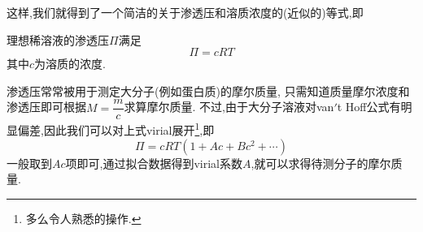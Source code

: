 \documentclass{ctexart}
\begin{document}
这样,我们就得到了一个简洁的关于渗透压和溶质浓度的(近似的)等式,即
\begin{theorem}
    理想稀溶液的渗透压$\Pi$满足
    \[\Pi=cRT\]
    其中$c$为溶质的浓度.
\end{theorem}
渗透压常常被用于测定大分子(例如蛋白质)的摩尔质量,%
只需知道质量摩尔浓度和渗透压即可根据$M=\dfrac{m}{c}$求算摩尔质量.%
不过,由于大分子溶液对van$'$t Hoff公式有明显偏差,因此我们可以对上式virial展开\footnote{多么令人熟悉的操作.},即
\[\Pi=cRT\left(1+Ac+Bc^2+\cdots\right)\]
一般取到$Ac$项即可,通过拟合数据得到virial系数$A$,就可以求得待测分子的摩尔质量.
\end{document}
